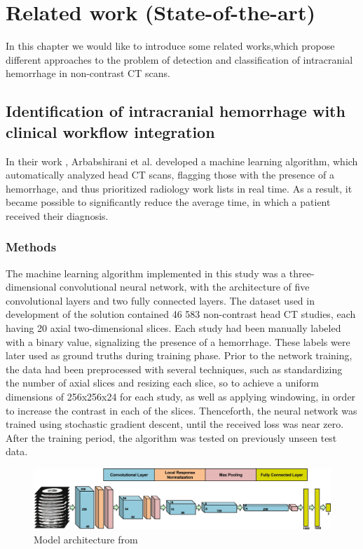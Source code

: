 \chapter{Related work (State-of-the-art)}
In this chapter we would like to introduce some related works,which propose different approaches to the problem of detection and classification of intracranial hemorrhage in non-contrast CT scans.

\section{Identification of intracranial hemorrhage with clinical workflow integration}
In their work \cite{relatedWork1}, Arbabshirani et al. developed a machine learning algorithm, which automatically analyzed head CT scans, flagging those with the presence of a hemorrhage, and thus prioritized radiology work lists in real time. As a result, it became possible to significantly reduce the average time, in which a patient received their diagnosis.  
\subsection*{Methods} 
The machine learning algorithm implemented in this study was a three-dimensional convolutional neural network, with the architecture of five convolutional layers and two fully connected layers. The dataset used in development of the solution contained 46 583 non-contrast head CT studies, each having 20 axial two-dimensional slices. Each study had been manually labeled with a binary value, signalizing the presence of a hemorrhage. These labels were later used as ground truths during training phase. Prior to the network training, the data had been preprocessed with several techniques, such as standardizing the number of axial slices and resizing each slice, so to achieve a uniform dimensions of 256x256x24 for each study, as well as applying windowing, in order to increase the contrast in each of the slices. Thenceforth, the neural network was trained using stochastic gradient descent, until the received loss was near zero. After the training period, the algorithm was tested on previously unseen test data.
\begin{figure}[!ht]
\begin{centering}
\includegraphics[width=16cm]{assets/images/RW1-net-arch.png}
\par\end{centering}
\caption{Model architecture from  \label{fig:rw1}}
\end{figure}
